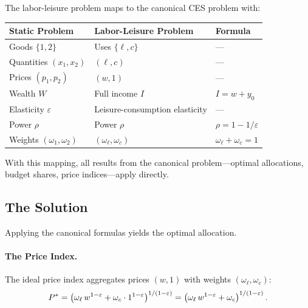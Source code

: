 \begin{calloutimportant}
The labor-leisure problem maps to the canonical CES problem with:
\begin{center}
\renewcommand{\arraystretch}{1.4}
\begin{tabular}{@{}lll@{}}
\toprule
\textbf{Static Problem} & \textbf{Labor-Leisure Problem} & \textbf{Formula} \\
\midrule
Goods $\{1, 2\}$ & Uses $\{\ell, c\}$ & --- \\
Quantities $(x_1, x_2)$ & $(\ell, c)$ & --- \\
Prices $(p_1, p_2)$ & $(w, 1)$ & --- \\
Wealth $W$ & Full income $I$ & $I = w + y_0$ \\
Elasticity $\varepsilon$ & Leisure-consumption elasticity & --- \\
Power $\rho$ & Power $\rho$ & $\rho = 1 - 1/\varepsilon$ \\
Weights $(\omega_1, \omega_2)$ & $(\omega_\ell, \omega_c)$ & $\omega_\ell + \omega_c = 1$ \\
\bottomrule
\end{tabular}
\end{center}
With this mapping, all results from the canonical problem---optimal allocations, budget shares, price indices---apply directly.
\end{calloutimportant}

\subsection{The Solution}
\label{subsec:labor-solution}

Applying the canonical formulas yields the optimal allocation.

\paragraph{The Price Index.}
The ideal price index aggregates prices $(w, 1)$ with weights $(\omega_\ell, \omega_c)$:
\begin{equation}
P^{*} = \left( \omega_\ell \, w^{1-\varepsilon} + \omega_c \cdot 1^{1-\varepsilon} \right)^{1/(1-\varepsilon)} = \left( \omega_\ell \, w^{1-\varepsilon} + \omega_c \right)^{1/(1-\varepsilon)}.
\label{eq:price-index-labor}
\end{equation}

